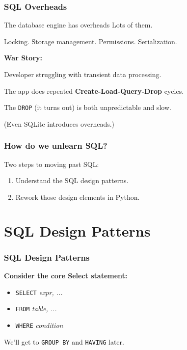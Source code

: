 \documentclass{beamer}
\begin{document}
\begin{frame}
    \frametitle{SQL Overheads}

    \begin{block}{The database engine has overheads}
        Lots of them.

        Locking. Storage management. Permissions. Serialization.
    \end{block}

    \textbf{War Story:}

    Developer struggling with transient data processing.

    The app does repeated \textbf{Create-Load-Query-Drop} cycles.

    The \texttt{DROP} (it turns out) is both unpredictable and slow.

    \vspace{1em}
    (Even SQLite introduces overheads.)
\end{frame}

\begin{frame}
    \frametitle{How do we unlearn SQL?}
    Two steps to moving past SQL:
    \begin{enumerate}
        \item Understand the SQL design patterns.
        \item Rework those design elements in Python.
    \end{enumerate}
\end{frame}

\section{SQL Design Patterns}
\begin{frame}
    \frametitle{SQL Design Patterns}

    \textbf{Consider the core Select statement:}

    \begin{itemize}
    \item[] \texttt{SELECT} \textit{expr, ...}

    \item[] \texttt{FROM} \textit{table, ...}

    \item[] \texttt{WHERE} \textit{condition}
    \end{itemize}

    \vspace{1em}

    We'll get to \texttt{GROUP BY} and \texttt{HAVING} later.

\end{frame}
\end{document}
